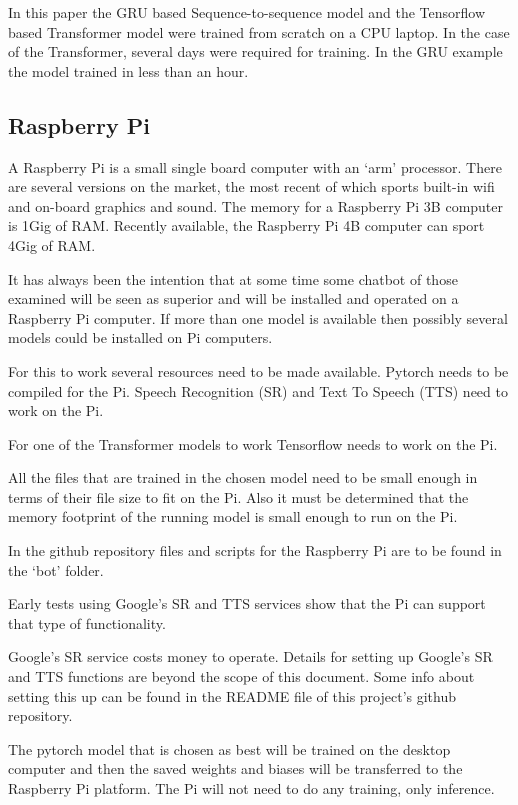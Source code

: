 In this paper the GRU based Sequence-to-sequence model and the Tensorflow based Transformer model were trained from scratch on a CPU laptop. In the case of the Transformer, several days were required for training. In the GRU example the model trained in less than an hour.

\subsection{Raspberry Pi}

A Raspberry Pi is a small single board computer with an `arm' processor. There are several versions on the market, the most recent of which sports built-in wifi and on-board graphics and sound. The memory for a Raspberry Pi 3B computer is 1Gig of RAM. Recently available, the Raspberry Pi 4B computer can sport 4Gig of RAM.

It has always been the intention that at some time some chatbot of those examined will be seen as superior and will be installed and operated on a Raspberry Pi computer. If more than one model is available then possibly several models could be installed on Pi computers.

For this to work several resources need to be made available. Pytorch needs to be compiled for the Pi. Speech Recognition (\ac{SR}) and Text To Speech (TTS) need to work on the Pi.

For one of the Transformer models to work Tensorflow needs to work on the Pi.

All the files that are trained in the chosen model need to be small enough in terms of their file size to fit on the Pi. Also it must be determined that the memory footprint of the running model is small enough to run on the Pi.

In the github repository files and scripts for the Raspberry Pi are to be found in the \textquoteleft bot\textquoteright{} folder.

Early tests using Google\textquoteright s SR and TTS services show that the Pi can support that type of functionality. 

Google's SR service costs money to operate. Details for setting up Google's SR and TTS functions are beyond the scope of this document. Some info about setting this up can be
found in the README file of this project\textquoteright s github repository.

The pytorch model that is chosen as best will be trained on the desktop computer and then the saved weights and biases will be transferred to the Raspberry Pi platform. The Pi will not need to do any training, only inference. 


